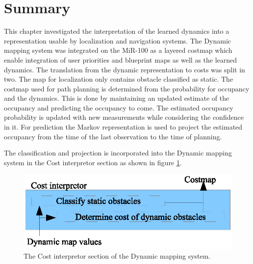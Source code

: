 \section{Summary}
This chapter investigated the interpretation of the learned dynamics into a representation usable by localization and navigation systems.
The Dynamic mapping system was integrated on the MiR-100 as a layered costmap which enable integration of user priorities and blueprint maps as well as the learned dynamics.
The translation from the dynamic representation to costs was split in two.
The map for localization only contains obstacle classified as static.
The costmap used for path planning is determined from the probability for occupancy and the dynamics.
This is done by maintaining an updated estimate of the occupancy and predicting the occupancy to come. 
The estimated occupancy probability is updated with new measurements while considering the confidence in it.
For prediction the Markov representation is used to project the estimated occupancy from the time of the last observation to the time of planning.

The classification and projection is incorporated into the Dynamic mapping system in the Cost interpretor section as shown in figure \ref{fig:cost_interpretor_detail}.

\begin{figure}[htbp]
	\centering
	\includegraphics[scale=1]{chapters/cost_interpretation/figures/cost_detail}
	\caption{The Cost interpretor section of the Dynamic mapping system.}
	\label{fig:cost_interpretor_detail}
\end{figure}

